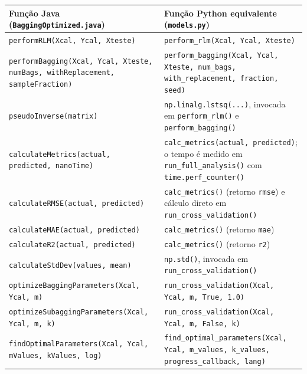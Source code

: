 \begin{quadro}[ht]
\begin{center}
\footnotesize
\captionsetup{justification=centering, labelsep=endash, width=0.75\linewidth}
\caption{Equivalência entre as funções do núcleo matemático: Java e Python.}
\label{tab:equiv_nucleo}
\begin{threeparttable}
\renewcommand{\arraystretch}{1.15}
\begin{tabularx}{\textwidth}{|>{\raggedright\arraybackslash}X|>{\raggedright\arraybackslash}X|}
\hline
\textbf{Função Java (\texttt{BaggingOptimized.java})} & \textbf{Função Python equivalente (\texttt{models.py})} \\ \hline
\texttt{performRLM(Xcal, Ycal, Xteste)} & \texttt{perform\_rlm(Xcal, Ycal, Xteste)} \\ \hline
\texttt{performBagging(Xcal, Ycal, Xteste, numBags, withReplacement, sampleFraction)} & \texttt{perform\_bagging(Xcal, Ycal, Xteste, num\_bags, with\_replacement, fraction, seed)} \\ \hline
\texttt{pseudoInverse(matrix)} & \texttt{np.linalg.lstsq(...)}, invocada em \texttt{perform\_rlm()} e \texttt{perform\_bagging()} \\ \hline
\texttt{calculateMetrics(actual, predicted, nanoTime)} & \texttt{calc\_metrics(actual, predicted)}; o tempo é medido em \texttt{run\_full\_analysis()} com \texttt{time.perf\_counter()} \\ \hline
\texttt{calculateRMSE(actual, predicted)} & \texttt{calc\_metrics()} (retorno \texttt{rmse}) e cálculo direto em \texttt{run\_cross\_validation()} \\ \hline
\texttt{calculateMAE(actual, predicted)} & \texttt{calc\_metrics()} (retorno \texttt{mae}) \\ \hline
\texttt{calculateR2(actual, predicted)} & \texttt{calc\_metrics()} (retorno \texttt{r2}) \\ \hline
\texttt{calculateStdDev(values, mean)} & \texttt{np.std()}, invocada em \texttt{run\_cross\_validation()} \\ \hline
\texttt{optimizeBaggingParameters(Xcal, Ycal, m)} & \texttt{run\_cross\_validation(Xcal, Ycal, m, True, 1.0)} \\ \hline
\texttt{optimizeSubaggingParameters(Xcal, Ycal, m, k)} & \texttt{run\_cross\_validation(Xcal, Ycal, m, False, k)} \\ \hline
\texttt{findOptimalParameters(Xcal, Ycal, mValues, kValues, log)} & \texttt{find\_optimal\_parameters(Xcal, Ycal, m\_values, k\_values, progress\_callback, lang)} \\ \hline

\end{tabularx}
\end{threeparttable}
\end{center}
\end{quadro}
